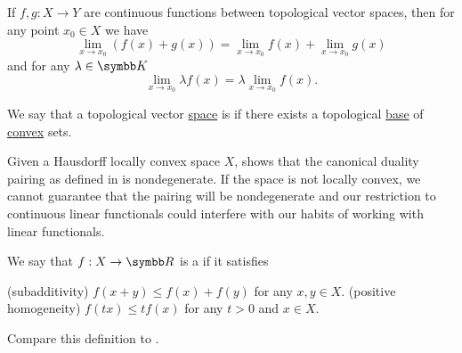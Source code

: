 \begin{corollary}\label{thm:linearity_of_function_limits}
  If \( f, g: X \to Y \) are continuous functions between topological vector spaces, then for any point \( x_0 \in X \) we have
  \begin{equation*}
    \lim_{x \to x_0} (f(x) + g(x)) = \lim_{x \to x_0} f(x) + \lim_{x \to x_0} g(x)
  \end{equation*}
  and for any \( \lambda \in \BK \)
  \begin{equation*}
    \lim_{x \to x_0} \lambda f(x) = \lambda \lim_{x \to x_0} f(x).
  \end{equation*}
\end{corollary}

\begin{definition}\label{def:locally_convex_space}\cite[1.8]{Rudin1991}
  We say that a topological vector \hyperref[def:topological_vector_space]{space} is  if there exists a topological \hyperref[def:topological_base]{base} of \hyperref[def:convex_set]{convex} sets.
\end{definition}

\begin{remark}\label{def:locally_convex_duality_pairing}
  Given a Hausdorff locally convex space \( X \),  shows that the canonical duality pairing as defined in  is nondegenerate. If the space is not locally convex, we cannot guarantee that the pairing will be nondegenerate and our restriction to continuous linear functionals could interfere with our habits of working with linear functionals.
\end{remark}

\begin{definition}\label{def:sublinear_functional}
  We say that \( f: X \to \BR \) is a  if it satisfies
  \begin{defenum}
    (subadditivity) \( f(x + y) \leq f(x) + f(y) \) for any \( x, y \in X \).
    (positive homogeneity) \( f(tx) \leq t f(x) \) for any \( t > 0 \) and \( x \in X \).
  \end{defenum}

  Compare this definition to .
\end{definition}

